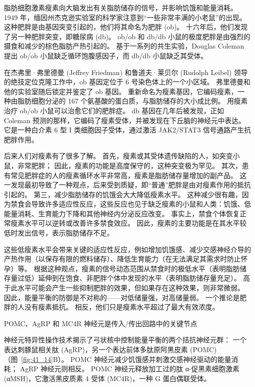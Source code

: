 脂肪细胞激素瘦素向大脑发出有关脂肪储存的信号，并影响饥饿和能量消耗。
1949 年，缅因州杰克逊实验室的科学家注意到“一些非常丰满的小老鼠”的出现。
这种肥胖是由基因突变引起的，他们将其命名为肥胖 (ob)。
十六年后，他们发现了另一种肥胖突变，即糖尿病 (db)。
ob/ob 和 db/db 小鼠的极度肥胖是由强烈的摄食和减少的棕色脂肪产热引起的。
基于一系列的共生实验，Douglas Coleman 提出 ob/ob 小鼠缺乏循环饱腹感因子，而 db/db 小鼠缺乏其受体。


在杰弗里·弗里德曼 (Jeffrey Friedman) 和鲁道夫·莱贝尔 (Rudolph Leibel) 领导的绝技定位克隆工作中，ob 基因定位于 6 号染色体上的一个小区域。
弗里德曼和他的实验室随后锁定并鉴定了 ob 基因。
重新命名为瘦素基因，它编码瘦素，一种由脂肪细胞分泌的 167 个氨基酸的蛋白质，与脂肪储存的大小成比例。
用瘦素治疗 ob/ob 小鼠可以治愈它们的肥胖症。
db 基因在几年后被发现，正如 Coleman 预测的那样，它编码了瘦素受体，并被发现在下丘脑的神经元中表达。
它是一种白介素 6 型 I 类细胞因子受体，通过激活 JAK2/STAT3 信号通路产生抗肥胖作用。


后来人们对瘦素有了很多了解。
首先，瘦素或其受体遗传缺陷的人，如突变小鼠，非常肥胖；
因此，瘦素的功能是高度保守的，这种突变极为罕见。
其次，患有常见肥胖症的人的瘦素循环水平非常高，瘦素是脂肪储存量增加的副产品。
这一发现最初导致了一种观点，后来受到质疑，即“普通”肥胖是由对瘦素作用的抵抗引起的。
第三，减少脂肪储存的饥饿会大大降低瘦素水平。
这种减少很有趣，因为禁食会导致许多适应性反应，这些反应也见于缺乏瘦素的小鼠和人类：饥饿、低能量消耗、生育能力下降和其他神经内分泌反应改变。
事实上，禁食个体恢复正常瘦素水平可以逆转或改善许多禁食效应。
因此，瘦素的主要功能是在其水平较低时发出信号，表示脂肪储存不足。


这些低瘦素水平会带来关键的适应性反应，例如增加饥饿感、减少交感神经介导的产热作用（以保存有限的燃料储存）、降低生育能力（在无法满足其需求时防止怀孕）等。
根据这种观点，瘦素的信号动态范围从禁食时的极低水平（表明脂肪储存量过低）延伸到在饱食、非肥胖个体中发现的水平（表明脂肪储存量充足）。
高于此水平可能会产生一些抑制肥胖的效果，但如果存在这种效果，则非常微弱。
因此，能量平衡的防御是不对称的——对低储量强，对高储量弱。
一个推论是肥胖的人没有瘦素抵抗。
相反，他们只是瘦素水平超过了最大有效浓度。


POMC、AgRP 和 MC4R 神经元是传入/传出回路中的关键节点

神经元特异性操作技术揭示了弓状核中控制能量平衡的两个拮抗神经元群：
一个表达刺豚鼠相关肽 (AgRP)，另一个表达前体多肽原阿黑皮素 (POMC)（图~\ref{fig:41_14}B）。
POMC 神经元减少饥饿感并刺激交感神经驱动的能量消耗；
AgRP 神经元则相反。 POMC 神经元释放加工过的肽 α-促黑素细胞激素 (αMSH)，它激活黑皮质素 4 受体 (MC4R)，一种 G 蛋白偶联受体。


